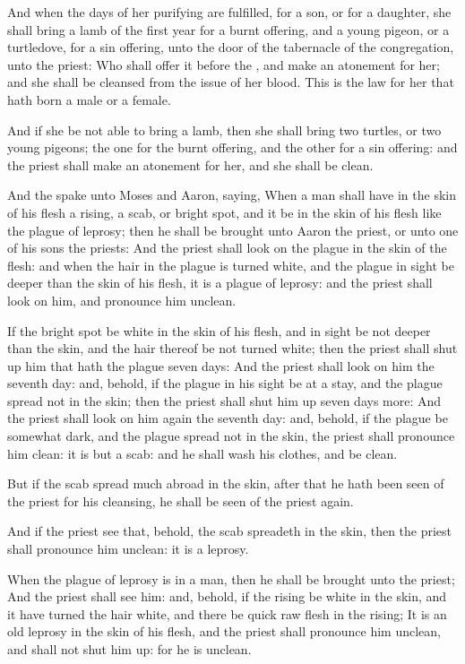 \Verse And when the days of her purifying are fulfilled, for a son, or for a daughter, she shall bring a lamb of the first year for a burnt offering, and a young pigeon, or a turtledove, for a sin offering, unto the door of the tabernacle of the congregation, unto the priest: \Verse Who shall offer it before the \LORD, and make an atonement for her; and she shall be cleansed from the issue of her blood. This is the law for her that hath born a male or a female.

\Verse And if she be not able to bring a lamb, then she shall bring two turtles, or two young pigeons; the one for the burnt offering, and the other for a sin offering: and the priest shall make an atonement for her, and she shall be clean.

\Chapter
\Verse And the \LORD spake unto Moses and Aaron, saying, \Verse When a man shall have in the skin of his flesh a rising, a scab, or bright spot, and it be in the skin of his flesh like the plague of leprosy; then he shall be brought unto Aaron the priest, or unto one of his sons the priests: \Verse And the priest shall look on the plague in the skin of the flesh: and when the hair in the plague is turned white, and the plague in sight be deeper than the skin of his flesh, it is a plague of leprosy: and the priest shall look on him, and pronounce him unclean.

\Verse If the bright spot be white in the skin of his flesh, and in sight be not deeper than the skin, and the hair thereof be not turned white; then the priest shall shut up him that hath the plague seven days: \Verse And the priest shall look on him the seventh day: and, behold, if the plague in his sight be at a stay, and the plague spread not in the skin; then the priest shall shut him up seven days more: \Verse And the priest shall look on him again the seventh day: and, behold, if the plague be somewhat dark, and the plague spread not in the skin, the priest shall pronounce him clean: it is but a scab: and he shall wash his clothes, and be clean.

\Verse But if the scab spread much abroad in the skin, after that he hath been seen of the priest for his cleansing, he shall be seen of the priest again.

\Verse And if the priest see that, behold, the scab spreadeth in the skin, then the priest shall pronounce him unclean: it is a leprosy.

\Verse When the plague of leprosy is in a man, then he shall be brought unto the priest; \Verse And the priest shall see him: and, behold, if the rising be white in the skin, and it have turned the hair white, and there be quick raw flesh in the rising; \Verse It is an old leprosy in the skin of his flesh, and the priest shall pronounce him unclean, and shall not shut him up: for he is unclean.

